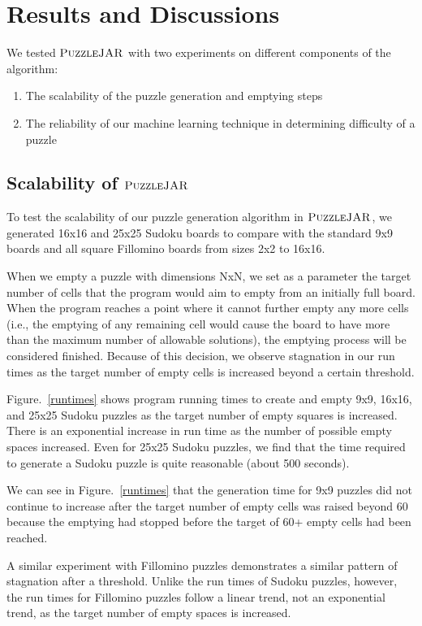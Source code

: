 \section{Results and Discussions}

We tested $\textsc{PuzzleJAR}$ with two experiments on different components of the algorithm:
\begin{enumerate}
\item The scalability of the puzzle generation and emptying steps
\item The reliability of our machine learning technique in determining difficulty of a puzzle
\end{enumerate}

\subsection{Scalability of $\textsc{PuzzleJAR}$}

To test the scalability of our puzzle generation algorithm in
$\textsc{PuzzleJAR}$, we generated 16x16 and 25x25 Sudoku boards to compare
with the standard 9x9 boards and all square Fillomino boards from
sizes 2x2 to 16x16.

When we empty a puzzle with dimensions NxN, we set as a parameter the
target number of cells that the program would aim to empty from an
initially full board. When the program reaches a point where it cannot
further empty any more cells (i.e., the emptying of any remaining cell
would cause the board to have more than the maximum number of
allowable solutions), the emptying process will be considered
finished. Because of this decision, we observe stagnation in our run times as
the target number of empty cells is increased beyond a certain
threshold.

Figure.~\ref{runtimes} shows program running times to create and empty 9x9, 16x16, and 25x25 Sudoku puzzles as the target number of empty squares is increased. There is an exponential increase in run time as the number of possible empty spaces increased. Even for 25x25 Sudoku puzzles, we find that the time required to generate a Sudoku puzzle is quite reasonable (about 500 seconds).

We can see in Figure.~\ref{runtimes} that the generation time for 9x9 puzzles did not continue to increase after the target number of empty cells was raised beyond 60 because the emptying had stopped before the target of 60+ empty cells had been reached. 

A similar experiment with Fillomino puzzles demonstrates a similar pattern of stagnation after a threshold. Unlike the run times of Sudoku puzzles, however, the run times for Fillomino puzzles follow a linear trend, not an exponential trend, as the target number of empty spaces is increased.


